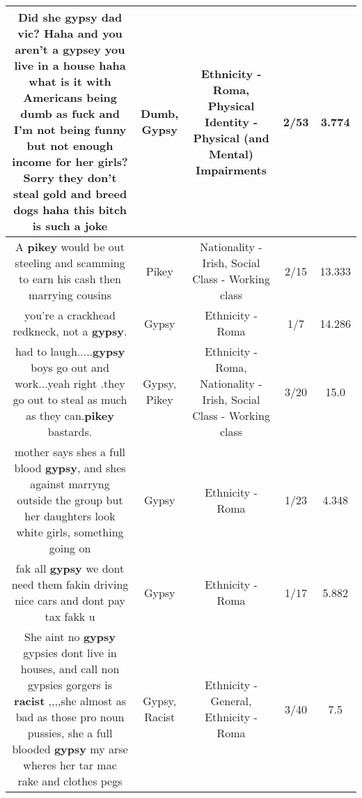 \documentclass[11pt]{article}
\newlength\mylength
\begin{document}
\begin{center}
\begin{longtable}{|C{.65\mylength}|C{.30\mylength}|C{.12\mylength}|C{.12\mylength}|C{.12\mylength}|}
  \small Did she \textbf{gypsy} dad vic? Haha and you aren't a gypsey you live in a house haha what is it with Americans being \textbf{dumb} as fuck and I'm not being funny but not enough income for her girls? Sorry they don't steal gold and breed dogs haha this bitch is such a joke\normalsize   & Dumb, Gypsy & Ethnicity - Roma, Physical Identity - Physical (and Mental) Impairments & 2/53 & 3.774 \\  \hline
  \small A \textbf{p\textbf{ikey}} would be out steeling and scamming to earn his cash then marrying cousins\normalsize   & Pikey & Nationality - Irish, Social Class - Working class & 2/15 & 13.333 \\  \hline
  \small you're a crackhead redkneck, not a \textbf{gypsy}.\normalsize   & Gypsy & Ethnicity - Roma & 1/7 & 14.286 \\  \hline
  \small had to laugh.....\textbf{gypsy} boys go out and work...yeah right .they go out to steal as much as they can.\textbf{p\textbf{ikey}} bastards.\normalsize   & Gypsy, Pikey & Ethnicity - Roma, Nationality - Irish, Social Class - Working class & 3/20 & 15.0 \\  \hline
  \small mother says shes a full blood \textbf{gypsy}, and shes against marryng outside the group but her daughters look white girls, something going on\normalsize   & Gypsy & Ethnicity - Roma & 1/23 & 4.348 \\  \hline
  \small fak all \textbf{gypsy} we dont need them fakin driving nice cars and dont pay tax fakk u\normalsize   & Gypsy & Ethnicity - Roma & 1/17 & 5.882 \\  \hline
  \small She aint no \textbf{gypsy} gypsies dont live in houses, and call non gypsies gorgers is \textbf{racist} ,,,,she almost as bad as those pro noun pussies, she a full blooded \textbf{gypsy} my arse wheres her tar mac rake and clothes pegs\normalsize   & Gypsy, Racist & Ethnicity - General, Ethnicity - Roma & 3/40 & 7.5 \\  \hline

\end{longtable}
\end{center}
\end{document}
